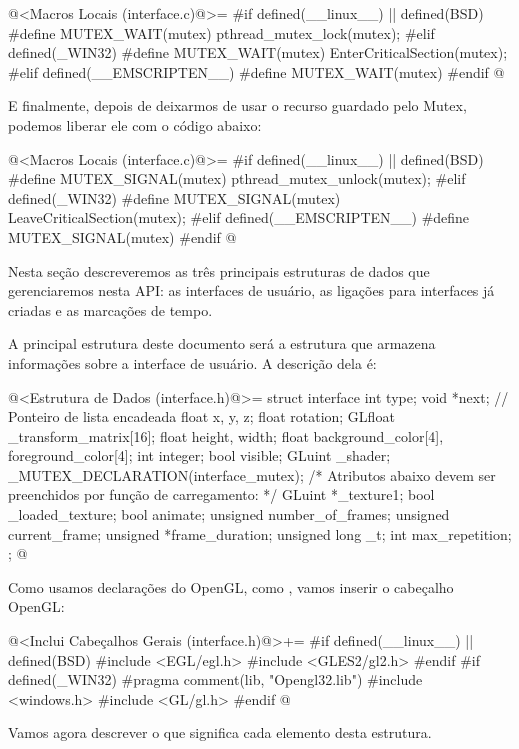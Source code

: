 \iniciocodigo
@<Macros Locais (interface.c)@>=
#if defined(__linux__) || defined(BSD)
#define MUTEX_WAIT(mutex) pthread_mutex_lock(mutex);
#elif defined(_WIN32)
#define MUTEX_WAIT(mutex) EnterCriticalSection(mutex);
#elif defined(__EMSCRIPTEN__)
#define MUTEX_WAIT(mutex)
#endif
@
\fimcodigo

E finalmente, depois de deixarmos de usar o recurso guardado pelo
Mutex, podemos liberar ele com o código abaixo:

\iniciocodigo
@<Macros Locais (interface.c)@>=
#if defined(__linux__) || defined(BSD)
#define MUTEX_SIGNAL(mutex) pthread_mutex_unlock(mutex);
#elif defined(_WIN32)
#define MUTEX_SIGNAL(mutex) LeaveCriticalSection(mutex);
#elif defined(__EMSCRIPTEN__)
#define MUTEX_SIGNAL(mutex)
#endif
@
\fimcodigo


Nesta seção descreveremos as três principais estruturas de dados que
gerenciaremos nesta API: as interfaces de usuário, as ligações para
interfaces já criadas e as marcações de tempo.


A principal estrutura deste documento será a estrutura que armazena
informações sobre a interface de usuário. A descrição dela é:

\iniciocodigo
@<Estrutura de Dados (interface.h)@>=
struct interface {
  int type;
  void *next; // Ponteiro de lista encadeada
  float x, y, z;
  float rotation;
  GLfloat _transform_matrix[16];
  float height, width;
  float background_color[4], foreground_color[4];
  int integer;
  bool visible;
  GLuint _shader;
  _MUTEX_DECLARATION(interface_mutex);
  /* Atributos abaixo devem ser preenchidos por função de carregamento: */
  GLuint *_texture1;
  bool _loaded_texture;
  bool animate;
  unsigned number_of_frames;
  unsigned current_frame;
  unsigned *frame_duration;
  unsigned long _t;
  int max_repetition;
};
@
\fimcodigo


Como usamos declarações do OpenGL, como , vamos
inserir o cabeçalho OpenGL:

\iniciocodigo
@<Inclui Cabeçalhos Gerais (interface.h)@>+=
#if defined(__linux__) || defined(BSD)
#include <EGL/egl.h>
#include <GLES2/gl2.h>
#endif
#if defined(_WIN32)
#pragma comment(lib, "Opengl32.lib")
#include <windows.h>
#include <GL/gl.h>
#endif
@
\fimcodigo

Vamos agora descrever o que significa cada elemento desta estrutura.

